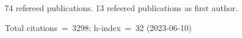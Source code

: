 74 refereed publications. 13 refeered publications as first author.

Total citations~=~3298; h-index~=~32 (2023-06-10)